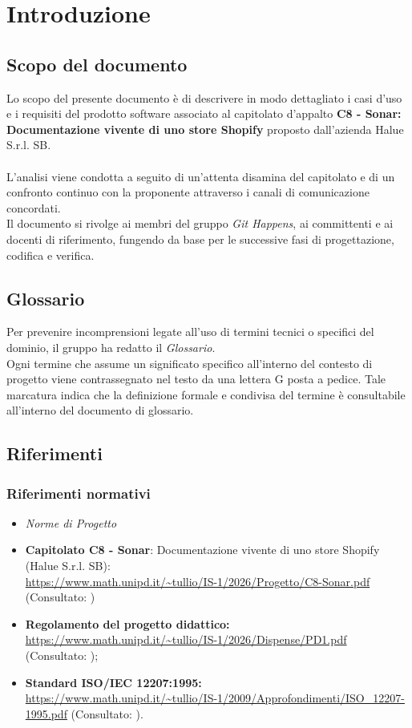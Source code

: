 \section{Introduzione}

\subsection{Scopo del documento}
Lo scopo del presente documento è di descrivere in modo dettagliato i casi d'uso e i requisiti del prodotto software associato al capitolato d'appalto \textbf{C8 - Sonar: Documentazione vivente di uno store Shopify} proposto dall'azienda Halue S.r.l. SB.\\ 
\\
L'analisi viene condotta a seguito di un'attenta disamina del capitolato e di un confronto continuo con la proponente attraverso i canali di comunicazione concordati.\\ 
Il documento si rivolge ai membri del gruppo \textit{Git Happens}, ai committenti e ai docenti di riferimento, fungendo da base per le successive fasi di progettazione, codifica e verifica.

\subsection{Glossario}
Per prevenire incomprensioni legate all'uso di termini tecnici o specifici del dominio, il gruppo ha redatto il \textit{Glossario}.\\
Ogni termine che assume un significato specifico all'interno del contesto di progetto viene contrassegnato nel testo da una lettera G posta a pedice. Tale marcatura indica che la definizione formale e condivisa del termine è consultabile all'interno del documento di glossario.

\subsection{Riferimenti}
\subsubsection{Riferimenti normativi}
\begin{itemize}
    \item \textit{Norme di Progetto}
    \item \textbf{Capitolato C8 - Sonar}: Documentazione vivente di uno store Shopify (Halue S.r.l. SB):\\
    \url{https://www.math.unipd.it/~tullio/IS-1/2026/Progetto/C8-Sonar.pdf}\\
    (Consultato: )
    \item \textbf{Regolamento del progetto didattico:} \\
    \url{https://www.math.unipd.it/~tullio/IS-1/2026/Dispense/PD1.pdf} (Consultato: );
    \item \textbf{Standard ISO/IEC 12207:1995:} \\
    \url{https://www.math.unipd.it/~tullio/IS-1/2009/Approfondimenti/ISO_12207-1995.pdf} (Consultato: ).
\end{itemize}


